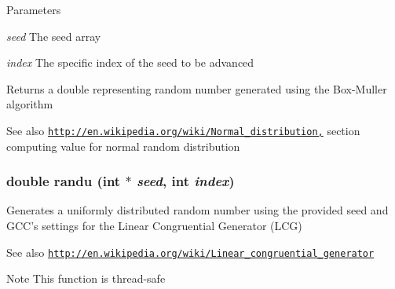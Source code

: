 \begin{DoxyParams}{Parameters}
\item[{\em seed}]The seed array \item[{\em index}]The specific index of the seed to be advanced \end{DoxyParams}
\begin{DoxyReturn}{Returns}
a double representing random number generated using the Box-\/Muller algorithm 
\end{DoxyReturn}
\begin{DoxySeeAlso}{See also}
\href{http://en.wikipedia.org/wiki/Normal_distribution,}{\tt http://en.wikipedia.org/wiki/Normal\_\-distribution,} section computing value for normal random distribution 
\end{DoxySeeAlso}
\hypertarget{ex__particle__CUDA__naive_8cu_ab1c72924f3fb8ede452cb4f287907741}{
\subsubsection[{randu}]{\setlength{\rightskip}{0pt plus 5cm}double randu (int $\ast$ {\em seed}, \/  int {\em index})}}
\label{ex__particle__CUDA__naive_8cu_ab1c72924f3fb8ede452cb4f287907741}
Generates a uniformly distributed random number using the provided seed and GCC's settings for the Linear Congruential Generator (LCG) \begin{DoxySeeAlso}{See also}
\href{http://en.wikipedia.org/wiki/Linear_congruential_generator}{\tt http://en.wikipedia.org/wiki/Linear\_\-congruential\_\-generator} 
\end{DoxySeeAlso}
\begin{DoxyNote}{Note}
This function is thread-\/safe 
\end{DoxyNote}

